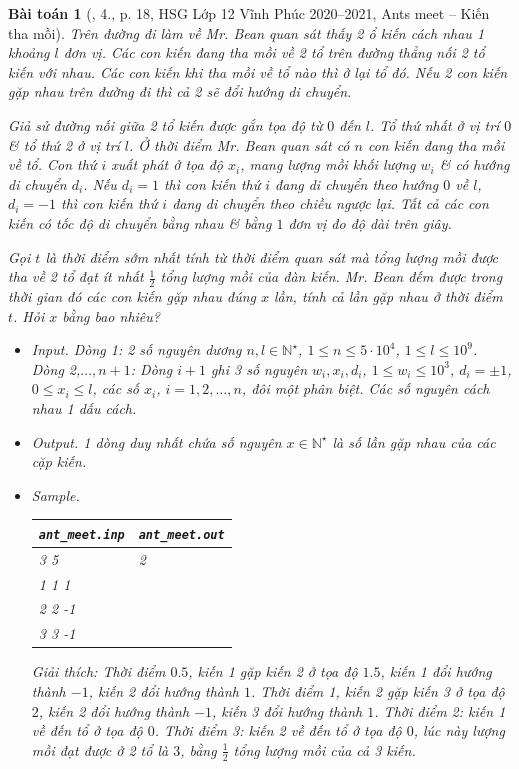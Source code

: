 \documentclass{article}
\newtheorem{baitoan}{Bài toán}
\begin{document}
\begin{baitoan}[\cite{Trung_HSG_THPT_Tin}, 4., p. 18, HSG Lớp 12 Vĩnh Phúc 2020--2021, Ants meet -- Kiến tha mồi]
	Trên đường đi làm về Mr. Bean quan sát thấy 2 ổ kiến cách nhau 1 khoảng $l$ đơn vị. Các con kiến đang tha mồi về 2 tổ trên đường thẳng nối 2 tổ kiến với nhau. Các con kiến khi tha mồi về tổ nào thì ở lại tổ đó. Nếu 2 con kiến gặp nhau trên đường đi thì cả 2 sẽ đổi hướng di chuyển.
	
	Giả sử đường nối giữa 2 tổ kiến được gắn tọa độ từ $0$ đến $l$. Tổ thứ nhất ở vị trí $0$ \& tổ thứ 2 ở vị trí $l$. Ở thời điểm Mr. Bean quan sát có $n$ con kiến đang tha mồi về tổ. Con thứ $i$ xuất phát ở tọa độ $x_i$, mang lượng mồi khối lượng $w_i$ \& có hướng di chuyển $d_i$. Nếu $d_i = 1$ thì con kiến thứ $i$ đang di chuyển theo hướng $0$ về $l$, $d_i = -1$ thì con kiến thứ $i$ đang di chuyển theo chiều ngược lại. Tất cả các con kiến có tốc độ di chuyển bằng nhau \& bằng $1$ đơn vị đo độ dài trên giây.
	
	Gọi $t$ là thời điểm sớm nhất tính từ thời điểm quan sát mà tổng lượng mồi được tha về 2 tổ đạt ít nhất $\frac{1}{2}$ tổng lượng mồi của đàn kiến. Mr. Bean đếm được trong thời gian đó các con kiến gặp nhau đúng $x$ lần, tính cả lần gặp nhau ở thời điểm $t$. Hỏi $x$ bằng bao nhiêu?
	\begin{itemize}
		\item {\sf Input.} Dòng 1: 2 số nguyên dương $n,l\in\mathbb{N}^\star$, $1\le n\le5\cdot10^4$, $1\le l\le10^9$. Dòng 2,$\ldots,n + 1$: Dòng $i + 1$ ghi 3 số nguyên $w_i,x_i,d_i$, $1\le w_i\le10^3$, $d_i = \pm1$, $0\le x_i\le l$, các số $x_i$, $i = 1,2,\ldots,n$, đôi một phân biệt. Các số nguyên cách nhau 1 dấu cách.
		\item {\sf Output.} 1 dòng duy nhất chứa số nguyên $x\in\mathbb{N}^\star$ là số lần gặp nhau của các cặp kiến.
		\item {\sf Sample.}
		\begin{table}[H]
			\centering
			\begin{tabular}{|l|l|}
				\hline
				\verb|ant_meet.inp| & \verb|ant_meet.out| \\
				\hline
				3 5 & 2 \\
				1 1 1 & \\
				2 2 -1 & \\
				3 3 -1 & \\
				\hline
			\end{tabular}
		\end{table}
		Giải thích: Thời điểm $0.5$, kiến 1 gặp kiến 2 ở tọa độ $1.5$, kiến 1 đổi hướng thành $-1$, kiến 2 đổi hướng thành $1$. Thời điểm 1, kiến 2 gặp kiến 3 ở tọa độ $2$, kiến 2 đổi hướng thành $-1$, kiến 3 đổi hướng thành $1$. Thời điểm 2: kiến 1 về đến tổ ở tọa độ $0$. Thời điểm 3: kiến 2 về đến tổ ở tọa độ $0$, lúc này lượng mồi đạt được ở 2 tổ là $3$, bằng  $\frac{1}{2}$ tổng lượng mồi của cả 3 kiến.
	\end{itemize}
\end{baitoan}
\end{document}
